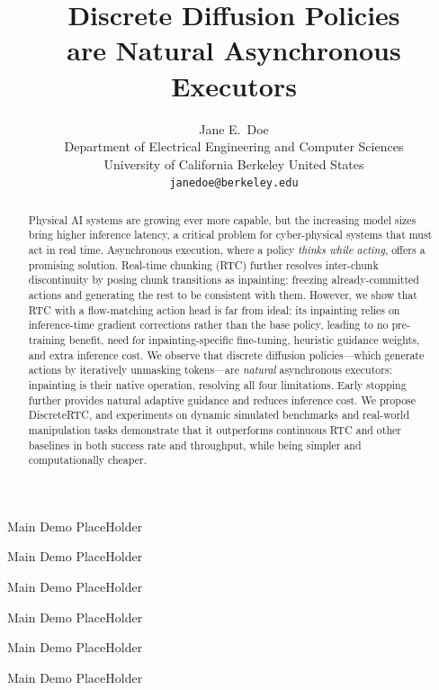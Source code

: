 \documentclass{article}
\title{Discrete Diffusion Policies \\ are Natural Asynchronous Executors}
\author{
  Jane E.~Doe\\
  Department of Electrical Engineering and Computer Sciences\\
  University of California Berkeley
  United States\\
  \texttt{janedoe@berkeley.edu} \\
}
\begin{document}
\maketitle


\begin{abstract}
Physical AI systems are growing ever more capable, but the increasing model sizes bring higher inference latency, a critical problem for cyber-physical systems that must act in real time.
Asynchronous execution, where a policy \emph{thinks while acting}, offers a promising solution. Real-time chunking (RTC) further resolves inter-chunk discontinuity by posing chunk transitions as inpainting: freezing already-committed actions and generating the rest to be consistent with them.
However, we show that RTC with a flow-matching action head is far from ideal: its inpainting relies on inference-time gradient corrections rather than the base policy, leading to no pre-training benefit, need for inpainting-specific fine-tuning, heuristic guidance weights, and extra inference cost.
We observe that discrete diffusion policies---which generate actions by iteratively unmasking tokens---are \emph{natural} asynchronous executors: inpainting is their native operation, resolving all four limitations. Early stopping further provides natural adaptive guidance and reduces inference cost.
We propose DiscreteRTC, and experiments on dynamic simulated benchmarks and real-world manipulation tasks demonstrate that it outperforms continuous RTC and other baselines in both success rate and throughput, while being simpler and computationally cheaper.
\end{abstract}



Main Demo PlaceHolder

Main Demo PlaceHolder

Main Demo PlaceHolder

Main Demo PlaceHolder

Main Demo PlaceHolder

Main Demo PlaceHolder
\end{document}
